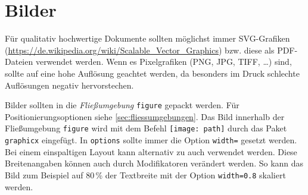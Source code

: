 \chapter{Bilder}
Für qualitativ hochwertige Dokumente sollten möglichst immer SVG-Grafiken (\url{https://de.wikipedia.org/wiki/Scalable_Vector_Graphics}) bzw. diese als PDF-Dateien verwendet werden. Wenn es Pixelgrafiken (PNG, JPG, TIFF, …) sind, sollte auf eine hohe Auflösung geachtet werden, da besonders im Druck schlechte Auflösungen negativ hervorstechen.

Bilder sollten in die \textit{Fließumgebung} \texttt{figure} gepackt werden. Für Positionierungsoptionen siehe \autoref{sec:fliessumgebungen}. Das Bild innerhalb der Fließumgebung \texttt{figure} wird mit dem Befehl \texttt{\texttt{[image: path]}} durch das Paket \texttt{graphicx} eingefügt. In \texttt{options} sollte immer die Option \texttt{width=\columnwidth} gesetzt werden. Bei einem einspaltigen Layout kann alternativ zu \texttt{\columnwidth} auch \texttt{\textwidth} verwendet werden. Diese Breitenangaben können auch durch Modifikatoren verändert werden. So kann das Bild zum Beispiel auf 80\,\% der Textbreite mit der Option \texttt{width=0.8\textwidth} skaliert werden.

